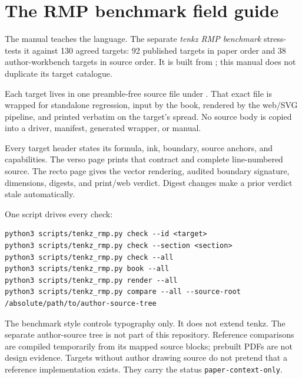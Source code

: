 \section{The RMP benchmark field guide}\label{ch:rmp}

The manual teaches the language.  The separate \emph{tenkz RMP benchmark}
stress-tests it against 130 agreed targets: 92 published targets in paper
order and 38 author-workbench targets in source order.  It is built from
; this manual does not duplicate its
target catalogue.

Each target lives in one preamble-free source file under
.  That exact file is wrapped for standalone
regression, input by the book, rendered by the web/SVG pipeline, and printed
verbatim on the target's spread.  No source body is copied into a driver,
manifest, generated wrapper, or manual.

Every target header states its formula, ink, boundary, source anchors, and
capabilities.  The verso page prints that contract and complete line-numbered
source.  The recto page gives the vector rendering, audited boundary
signature, dimensions, digests, and print/web verdict.  Digest changes make a
prior verdict stale automatically.

One script drives every check:

\begin{Verbatim}[fontsize=\footnotesize,frame=leftline]
python3 scripts/tenkz_rmp.py check --id <target>
python3 scripts/tenkz_rmp.py check --section <section>
python3 scripts/tenkz_rmp.py check --all
python3 scripts/tenkz_rmp.py book --all
python3 scripts/tenkz_rmp.py render --all
python3 scripts/tenkz_rmp.py compare --all --source-root /absolute/path/to/author-source-tree
\end{Verbatim}

The benchmark style controls typography only.  It does not extend tenkz.
The separate author-source tree is not part of this repository.  Reference
comparisons are compiled temporarily from its mapped source blocks; prebuilt
PDFs are not design evidence.  Targets without author drawing source do not
pretend that a reference implementation exists.  They carry the status
\texttt{paper-context-}\allowbreak\texttt{only}.
